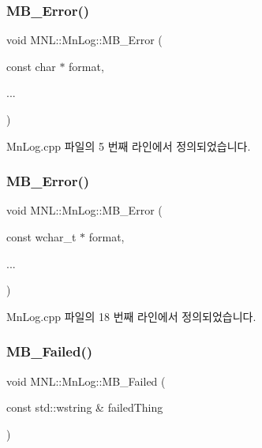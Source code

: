 \subsubsection{\texorpdfstring{M\+B\+\_\+\+Error()}{MB\_Error()}\hspace{0.1cm}{\footnotesize\ttfamily [1/2]}}
{\footnotesize\ttfamily void M\+N\+L\+::\+Mn\+Log\+::\+M\+B\+\_\+\+Error (\begin{DoxyParamCaption}\item[{const char $\ast$}]{format,  }\item[{}]{... }\end{DoxyParamCaption})}



Mn\+Log.\+cpp 파일의 5 번째 라인에서 정의되었습니다.

\mbox{\label{namespace_m_n_l_1_1_mn_log_a991c653f770d7dcf1dba7bd2b665b769}} 
\subsubsection{\texorpdfstring{M\+B\+\_\+\+Error()}{MB\_Error()}\hspace{0.1cm}{\footnotesize\ttfamily [2/2]}}
{\footnotesize\ttfamily void M\+N\+L\+::\+Mn\+Log\+::\+M\+B\+\_\+\+Error (\begin{DoxyParamCaption}\item[{const wchar\+\_\+t $\ast$}]{format,  }\item[{}]{... }\end{DoxyParamCaption})}



Mn\+Log.\+cpp 파일의 18 번째 라인에서 정의되었습니다.

\mbox{\label{namespace_m_n_l_1_1_mn_log_a4d03842c65201488edbb5a7da1320ac9}} 
\subsubsection{\texorpdfstring{M\+B\+\_\+\+Failed()}{MB\_Failed()}\hspace{0.1cm}{\footnotesize\ttfamily [1/2]}}
{\footnotesize\ttfamily void M\+N\+L\+::\+Mn\+Log\+::\+M\+B\+\_\+\+Failed (\begin{DoxyParamCaption}\item[{const std\+::wstring \&}]{failed\+Thing }\end{DoxyParamCaption})}



